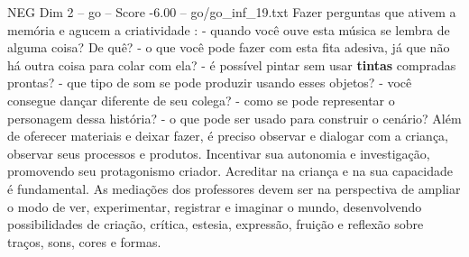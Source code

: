 \begin{textsample}{NEG Dim 2 – go – Score -6.00 – go/go\_inf\_19.txt}
Fazer perguntas que ativem a memória e agucem a criatividade : - quando você ouve esta música se lembra de alguma coisa?
De quê? - o que você pode fazer com esta fita adesiva, já que não há outra coisa para colar com ela? - é possível pintar sem usar \textbf{tintas} compradas prontas? - que tipo de som se pode produzir usando esses objetos? - você consegue dançar diferente de seu colega? - como se pode representar o personagem dessa história? - o que pode ser usado para construir o cenário?
Além de oferecer materiais e deixar fazer, é preciso observar e dialogar com a criança, observar seus processos e produtos.
Incentivar sua autonomia e investigação, promovendo seu protagonismo criador.
Acreditar na criança e na sua capacidade é fundamental.
As mediações dos professores devem ser na perspectiva de ampliar o modo de ver, experimentar, registrar e imaginar o mundo, desenvolvendo possibilidades de criação, crítica, estesia, expressão, fruição e reflexão sobre traços, sons, cores e formas.

\end{textsample}
